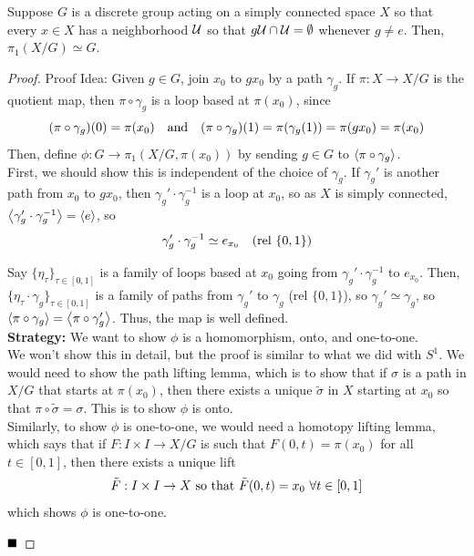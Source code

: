 
\begin{lemma}
    Suppose $G$ is a discrete group acting on a simply connected space $X$ so that every $x \in X$ has a neighborhood $\cal{U}$ so that $g\cal{U} \cap \cal{U} = \emptyset$ whenever $g \neq e$. Then, $\pi_1(X / G) \simeq G$.
\end{lemma}
\begin{proof}{Proof Idea:}
    Given $g \in G$, join $x_0$ to $gx_0$ by a path $\gamma_g$. If $\pi : X \to X/G$ is the quotient map, then $\pi \circ \gamma_g$ is a loop based at $\pi(x_0)$, since
    \[ (\pi \circ \gamma_g)(0) = \pi(x_0) \quand (\pi \circ \gamma_g)(1) = \pi(\gamma_g(1)) = \pi(gx_0) = \pi(x_0) \]
    Then, define $\phi : G \to \pi_1(X/G, \pi(x_0))$ by sending $g \in G$ to $\brac{\pi \circ \gamma_g}$.\\


    First, we should show this is independent of the choice of $\gamma_g$. If $\gamma_g'$ is another path from $x_0$ to $gx_0$, then $\gamma_g' \cdot \gamma_g^{-1}$ is a loop at $x_0$, so as $X$ is simply connected, $\brac{\gamma_g' \cdot \gamma_g^{-1}} = \brac{e}$, so
    \[ \gamma_g' \cdot \gamma_g^{-1} \simeq e_{x_0} \quad (\tt{rel } \{0, 1\}) \]

    Say $\{\eta_{\tau}\}_{\tau \in [0, 1]}$ is a family of loops based at $x_0$ going from $\gamma_g' \cdot \gamma_g^{-1}$ to $e_{x_0}$. Then, $\{\eta_{\tau} \cdot \gamma_g\}_{\tau \in [0, 1]}$ is a family of paths from $\gamma_g'$ to $\gamma_g$ (rel $\{0, 1\}$), so $\gamma_g' \simeq \gamma_g$, so $\brac{\pi \circ \gamma_g} = \brac{\pi \circ \gamma_g'}$. Thus, the map is well defined.\\

    \textbf{Strategy:} We want to show $\phi$ is a homomorphism, onto, and one-to-one.\\

    We won't show this in detail, but the proof is similar to what we did with $S^1$. We would need to show the path lifting lemma, which is to show that if $\sigma$ is a path in $X/G$ that starts at $\pi(x_0)$, then there exists a unique $\tilde{\sigma}$ in $X$ starting at $x_0$ so that $\pi \circ \tilde{\sigma} = \sigma$. This is to show $\phi$ is onto.\\

    Similarly, to show $\phi$ is one-to-one, we would need a homotopy lifting lemma, which says that if $F : I \times I \to X/G$ is such that $F(0, t) = \pi(x_0)$ for all $t \in [0, 1]$, then there exists a unique lift
    \[ \tilde{F} : I \times I \to X \tt{ so that } \tilde{F}(0, t) = x_0\ \forall t \in [0, 1] \]
    which shows $\phi$ is one-to-one.

    $\qed$
\end{proof}

